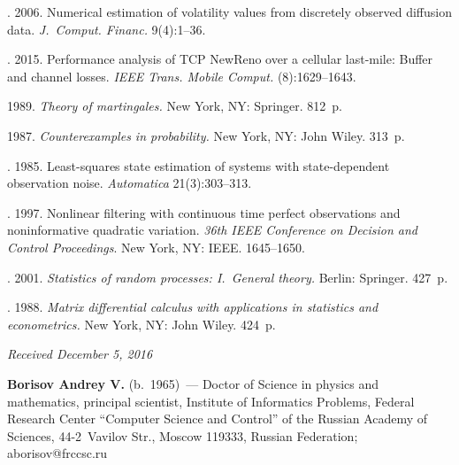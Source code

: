 \begin{multicols}{2}
{{\begin{thebibliography}{99}
\columnbreak

. 2006.
Numerical estimation of volatility values from discretely observed
  diffusion data.
\textit{J.~Comput. Financ.} 9(4):1--36.

. 2015.
Performance analysis of {TCP} {N}ew{R}eno over a cellular last-mile:
  Buffer and channel losses. \textit{IEEE Trans. Mobile Comput.} (8):1629--1643.

 1989. \textit{Theory of martingales.}
New York, NY: Springer. 812~p.

 1987. 
\textit{Counterexamples in probability.} New York, NY: John Wiley. 313~p.


. 1985. 
Least-squares state estimation of systems with state-dependent observation noise. 
\textit{Automatica} 21(3):303--313.

. 1997. Nonlinear filtering with continuous time
perfect observations and noninformative quadratic variation. 
\textit{36th IEEE Conference on Decision and Control Proceedings}. New York, NY:  IEEE. 
1645--1650.


.
2001. \textit{Statistics of random processes: I.~General theory.} 
Berlin: Springer. 427~p.

. 1988. 
\textit{Matrix differential calculus with applications in statistics and econometrics.} 
New York, NY: John Wiley. 424~p.
\end{thebibliography}

 }
 }

\end{multicols}

\vspace*{-3pt}

\hfill{\small\textit{Received December 5, 2016}}

\Contrl

\noindent
\textbf{Borisov Andrey V.} (b.\ 1965)~--- 
Doctor of Science in physics and mathematics, principal scientist, Institute of
Informatics Problems, Federal Research Center ``Computer Science and Control'' 
of the Russian Academy of
Sciences, 44-2~Vavilov Str., Moscow 119333, Russian Federation; 
\mbox{aborisov@frccsc.ru}
\label{end\stat}


\renewcommand{\bibname}{\protect\rm Литература} 